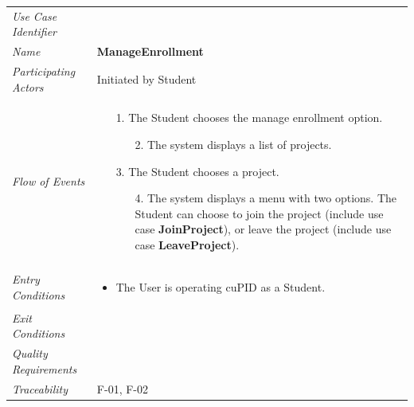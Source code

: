 \documentclass[12pt,letterpaper]{article}
\begin{document}
\begin{center}
	\begin{tabu} to 
		\toprule
		Use Case Identifier & \manageenrollment{} \\
		Name & {\bf ManageEnrollment} \\
		Participating Actors & Initiated by Student \\
		Flow of Events & 
		\begin{minipage}[t]{\linewidth}
		    \begin{enumerate}
			    \item[1.] The Student chooses the manage enrollment option.
			    \begin{enumerate}
			        \item[2.] The system displays a list of projects.
				\end{enumerate}
				\item[3.] The Student chooses a project.
				\begin{enumerate}
				    \item[4.] The system displays a menu with two options. The Student can choose to join the project (include use case \textbf{JoinProject}), or leave the project (include use case \textbf{LeaveProject}).
				\end{enumerate}
	        \end{enumerate}
		\end{minipage} \\

		Entry Conditions &
		\begin{minipage}[t]{\linewidth}
			\begin{itemize}
			    \item The User is operating cuPID as a Student.
	        \end{itemize}
		\end{minipage} \\

		Exit Conditions & \\


		Quality Requirements & \\

		Traceability & F-01, F-02\\
		\toprule
	\end{tabu}
\end{center}
\end{document}
